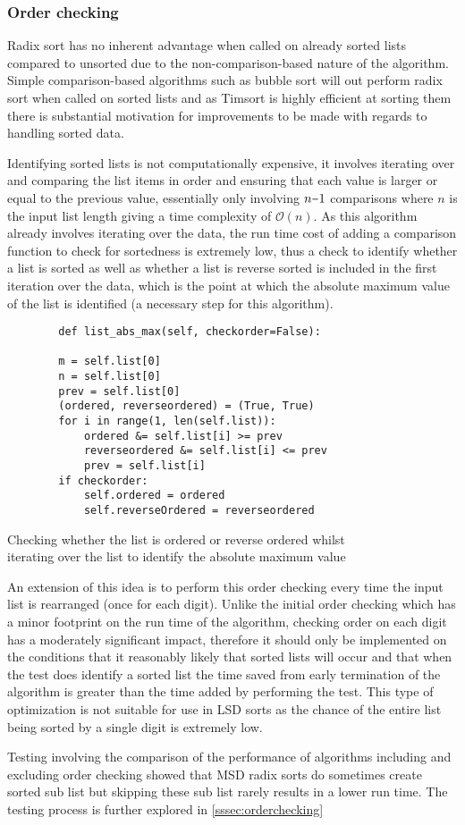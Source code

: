 \documentclass[12pt]{article}
\newcommand{\minus}{\scalebox{0.75}[1.0]{$-$}}
\begin{document}
	\subsubsection{Order checking}
	\label{sssec:order}
Radix sort has no inherent advantage when called on already sorted lists compared to unsorted due to the non-comparison-based nature of the algorithm. Simple comparison-based algorithms such as bubble sort will out perform radix sort when called on sorted lists and as Timsort is highly efficient at sorting them there is substantial motivation for improvements to be made with regards to handling sorted data.
\par
Identifying sorted lists is not computationally expensive, it involves iterating over and comparing the list items in order and ensuring that each value is larger or equal to the previous value, essentially only involving $n\minus1$ comparisons where $n$ is the input list length giving a time complexity of $\mathcal{O}(n)$. As this algorithm already involves iterating over the data, the run time cost of adding a comparison function to check for sortedness is extremely low, thus a check to identify whether a list is sorted as well as whether a list is reverse sorted is included in the first iteration over the data, which is the point at which the absolute maximum value of the list is identified (a necessary step for this algorithm).
\begin{table}[H]
	\centering
	\begin{lstlisting}
		def list_abs_max(self, checkorder=False):
	
		m = self.list[0]
		n = self.list[0]
		prev = self.list[0]
		(ordered, reverseordered) = (True, True)
		for i in range(1, len(self.list)):
			ordered &= self.list[i] >= prev
			reverseordered &= self.list[i] <= prev
			prev = self.list[i]
		if checkorder:
			self.ordered = ordered
			self.reverseOrdered = reverseordered
	\end{lstlisting}
	\caption*{Checking whether the list is ordered or reverse ordered whilst\\ iterating over the list to identify the absolute maximum value}
\end{table}
\par
An extension of this idea is to perform this order checking every time the input list is rearranged (once for each digit). Unlike the initial order checking which has a minor footprint on the run time of the algorithm, checking order on each digit has a moderately significant impact, therefore it should only be implemented on the conditions that it reasonably likely that sorted lists will occur and that when the test does identify a sorted list the time saved from early termination of the algorithm is greater than the time added by performing the test. This type of optimization is not suitable for use in LSD sorts as the chance of the entire list being sorted by a single digit is extremely low.
\par
Testing involving the comparison of the performance of algorithms including and excluding order checking showed that MSD radix sorts do sometimes create sorted sub list but skipping these sub list rarely results in a lower run time. The testing process is further explored in \ref{sssec:orderchecking}
\pagebreak
\end{document}
